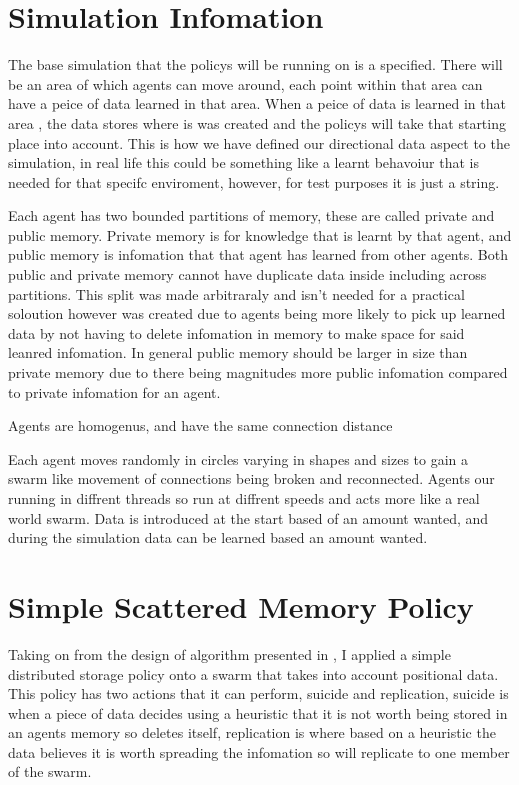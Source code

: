\documentclass{UoYCSproject}
\begin{document}
\section{Simulation Infomation}
\label{sec:Sim Info}

The base simulation that the policys will be running on is a specified.
There will be an area of which agents can move around, each point within that area can have a peice of data learned in that area.
When a peice of data is learned in that area , the data stores where is was created and the policys will take that starting place into account.
This is how we have defined our directional data aspect to the simulation, in real life this could be something like a learnt behavoiur that is needed for that specifc enviroment, however, for test purposes it is just a string.

Each agent has two bounded partitions of memory, these are called private and public memory.
Private memory is for knowledge that is learnt by that agent, and public memory is infomation that that agent has learned from other agents.
Both public and private memory cannot have duplicate data inside including across partitions.
This split was made arbitraraly and isn't needed for a practical soloution however was created due to agents being more likely to pick up learned data by not having to delete infomation in memory to make space for said leanred infomation.
In general public memory should be larger in size than private memory due to there being magnitudes more public infomation compared to private infomation for an agent.

Agents are homogenus, and have the same connection distance

Each agent moves randomly in circles varying in shapes and sizes to gain a swarm like movement of connections being broken and reconnected.
Agents our running in diffrent threads so run at diffrent speeds and acts more like a real world swarm.
Data is introduced at the start based of an amount wanted, and during the simulation data can be learned based an amount wanted.

\section{Simple Scattered Memory Policy}
\label{sec:Simple1}

Taking on from the design of algorithm presented in \cite{Distributed Storage}, I applied a simple distributed storage policy onto a swarm that takes into account positional data.
This policy has two actions that it can perform, suicide and replication, suicide is when a piece of data decides using a heuristic that it is not worth being stored in an agents memory so deletes itself, replication is where based on a heuristic the data believes it is worth spreading the infomation so will replicate to one member of the swarm.
\end{document}
